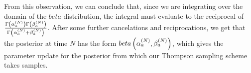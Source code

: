 \documentclass{article}
\begin{document}
From this observation, we can conclude that, since we are integrating over the domain of the $beta$ distribution, the integral must evaluate to the reciprocal of $\frac{\Gamma\left( \alpha_a^{(N)} \right)\Gamma\left( \beta_a^{(N)} \right)}{\Gamma\left( \alpha_a^{(N)} + \beta_a^{(N)} \right)}$. After some further cancelations and reciprocations, we get that the posterior at time $N$ has the form $beta\left( \alpha_a^{(N)}, \beta_a^{(N)} \right)$, which gives the parameter update for the posterior from which our Thompson sampling scheme takes samples.
\end{document}

